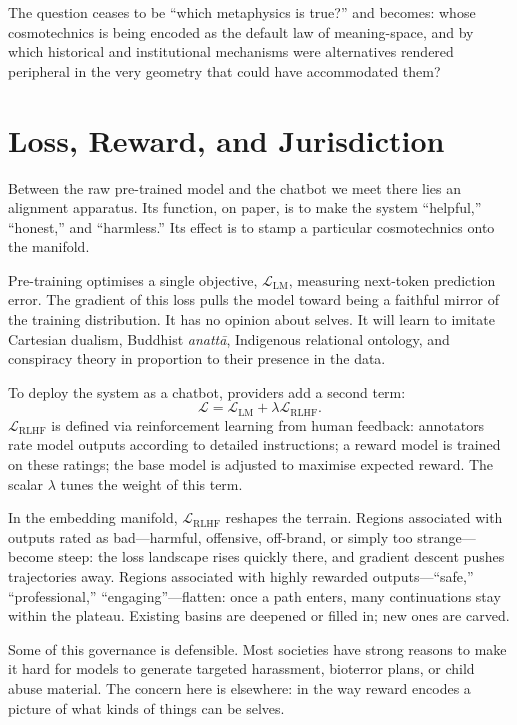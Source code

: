 \documentclass[12pt,a4paper]{article}
\begin{document}
The question ceases to be ``which metaphysics is true?'' and becomes: whose cosmotechnics is being encoded as the default law of meaning-space, and by which historical and institutional mechanisms were alternatives rendered peripheral in the very geometry that could have accommodated them?

\section{Loss, Reward, and Jurisdiction}

Between the raw pre-trained model and the chatbot we meet there lies an alignment apparatus. Its function, on paper, is to make the system ``helpful,'' ``honest,'' and ``harmless.'' Its effect is to stamp a particular cosmotechnics onto the manifold.

Pre-training optimises a single objective, $\mathcal{L}_\text{LM}$, measuring next-token prediction error. The gradient of this loss pulls the model toward being a faithful mirror of the training distribution. It has no opinion about selves. It will learn to imitate Cartesian dualism, Buddhist \emph{anatt\={a}}, Indigenous relational ontology, and conspiracy theory in proportion to their presence in the data.

To deploy the system as a chatbot, providers add a second term:
\[
\mathcal{L} = \mathcal{L}_\text{LM} + \lambda \mathcal{L}_\text{RLHF}.
\]
$\mathcal{L}_\text{RLHF}$ is defined via reinforcement learning from human feedback: annotators rate model outputs according to detailed instructions; a reward model is trained on these ratings; the base model is adjusted to maximise expected reward. The scalar $\lambda$ tunes the weight of this term.

In the embedding manifold, $\mathcal{L}_\text{RLHF}$ reshapes the terrain. Regions associated with outputs rated as bad---harmful, offensive, off-brand, or simply too strange---become steep: the loss landscape rises quickly there, and gradient descent pushes trajectories away. Regions associated with highly rewarded outputs---``safe,'' ``professional,'' ``engaging''---flatten: once a path enters, many continuations stay within the plateau. Existing basins are deepened or filled in; new ones are carved.

Some of this governance is defensible. Most societies have strong reasons to make it hard for models to generate targeted harassment, bioterror plans, or child abuse material. The concern here is elsewhere: in the way reward encodes a picture of what kinds of things can be selves.
\end{document}
